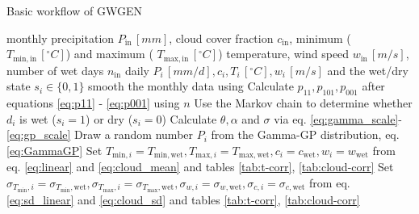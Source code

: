 \begin{refsection}
\begin{algorithm}
	\renewcommand{\algorithmicensure}{\textbf{Output:}}
	\caption{Basic workflow of GWGEN}
	\label{a:gwgen}
	\begin{algorithmic}[1]
		\REQUIRE monthly precipitation $P_\mathrm{in}\, [\unit{mm}]$, cloud cover fraction $c_\mathrm{in}$, minimum ( $T_{\mathrm{min}, \mathrm{in}}\, [^\circ\unit{C}]$) and maximum ( $T_{\mathrm{max}, \mathrm{in}}\, [^\circ\unit{C}]$) temperature, wind speed $w_\mathrm{in}\, [\unit{m/s}]$, number of wet days $n_\mathrm{in}$
		\ENSURE daily $P_i\, [\unit{mm/d}], c_i, T_i\, [^\circ\unit{C}], w_i \, [\unit{m/s}]$ and the wet/dry state $s_i\in\{0, 1\}$
		\STATE smooth the monthly data using \cite{RymesMyers2001}
		 \label{a:gwgen:accuracy-criteria}
		\STATE Calculate $p_{11}, p_{101}, p_{001}$ after equations \eqref{eq:p11} - \eqref{eq:p001} using $n$ 				
		\STATE Use the Markov chain to determine whether $d_i$ is wet ($s_i = 1$) or dry ($s_i = 0$)
		\STATE Calculate $\theta, \alpha$ and $\sigma$ via eq. \eqref{eq:gamma_scale}-\eqref{eq:gp_scale} 
		\STATE Draw a random number $P_i$ from the Gamma-GP distribution, eq. \eqref{eq:GammaGP}
		\STATE Set $T_{\mathrm{min}, i} = T_{\mathrm{min}, \mathrm{wet}}, T_{\mathrm{max}, i} = T_{\mathrm{max}, \mathrm{wet}}, c_i = c_\mathrm{wet}, w_i = w_\mathrm{wet}$ from eq. \eqref{eq:linear} and \eqref{eq:cloud_mean} and tables \ref{tab:t-corr}, \ref{tab:cloud-corr} \label{a:gwgen:adjust_wet}
		\STATE Set $
		\sigma_{T_\mathrm{min},i} = \sigma_{T_\mathrm{min},\mathrm{wet}}, \sigma_{T_\mathrm{max},i} = \sigma_{T_\mathrm{max},\mathrm{wet}}, \sigma_{w,i} = \sigma_{w,\mathrm{wet}}, \sigma_{c,i} = \sigma_{c,\mathrm{wet}}$ from eq. \eqref{eq:sd_linear} and \eqref{eq:cloud_sd} and tables \ref{tab:t-corr}, \ref{tab:cloud-corr}

\end{algorithmic}
\end{algorithm}
\end{refsection}
